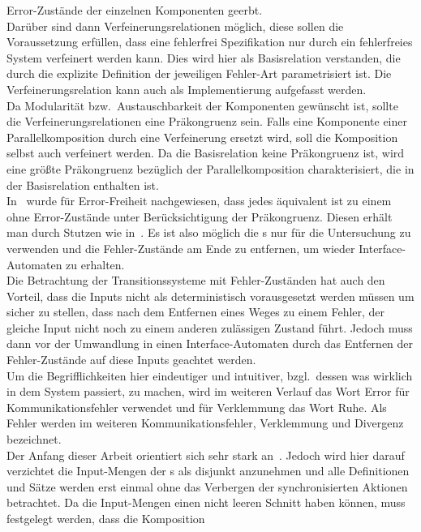 Error-Zustände der einzelnen Komponenten geerbt.\\
Darüber sind dann Verfeinerungsrelationen möglich, diese sollen die
Voraussetzung erfüllen, dass eine fehlerfrei Spezifikation nur durch ein
fehlerfreies System verfeinert werden kann. Dies wird hier als Basisrelation
verstanden, die durch die explizite Definition der jeweiligen Fehler-Art parametrisiert
ist. Die Verfeinerungsrelation kann auch als Implementierung aufgefasst
werden.\\
Da Modularität bzw.\ Austauschbarkeit der Komponenten gewünscht ist, sollte die
Verfeinerungsrelationen eine Präkongruenz sein. Falls eine Komponente einer
Parallelkomposition durch eine Verfeinerung ersetzt wird, soll die Komposition
selbst auch verfeinert werden. Da die Basisrelation keine Präkongruenz ist,
wird eine größte Präkongruenz bezüglich der Parallelkomposition
charakterisiert, die in der Basisrelation enthalten ist.\\
In~\cite{Vogler2014EIO} wurde für Error-Freiheit nachgewiesen, dass jedes \EIO{}
äquivalent ist zu einem ohne Error-Zustände unter Berücksichtigung der
Präkongruenz. Diesen erhält man durch Stutzen wie in~\cite{Alfaro2004}. Es ist
also möglich die \EIO{}s nur für die Untersuchung zu verwenden und die
Fehler-Zustände am Ende zu entfernen, um wieder Interface-Automaten zu
erhalten.\\
Die Betrachtung der Transitionssysteme mit Fehler-Zuständen hat auch den
Vorteil, dass die Inputs nicht als deterministisch vorausgesetzt werden müssen
um sicher zu stellen, dass nach dem Entfernen eines Weges zu einem Fehler, der
gleiche Input nicht noch zu einem anderen zulässigen Zustand führt. Jedoch muss
dann vor der Umwandlung in einen Interface-Automaten durch das Entfernen der
Fehler-Zustände auf diese Inputs geachtet werden.\\
Um die Begrifflichkeiten hier eindeutiger und intuitiver, bzgl.\ dessen was
wirklich in dem System passiert, zu machen, wird im weiteren Verlauf
das Wort Error für Kommunikationsfehler verwendet und für Verklemmung das Wort
Ruhe. Als Fehler werden im weiteren Kommunikationsfehler, Verklemmung und
Divergenz bezeichnet.\\
Der Anfang dieser Arbeit orientiert sich sehr stark an~\cite{Vogler2014EIO}.
Jedoch wird hier darauf verzichtet die Input-Mengen der \EIO{}s als disjunkt
anzunehmen und alle Definitionen und Sätze werden erst einmal ohne das
Verbergen der synchronisierten Aktionen betrachtet. Da die Input-Mengen einen
nicht leeren Schnitt haben können, muss festgelegt werden, dass die Komposition

